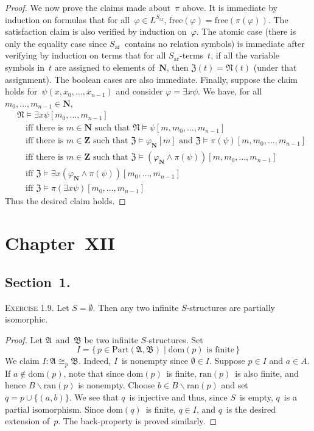 \documentclass[letterpaper]{article}
\newcommand{\N}{\mathbf{N}}
\newcommand{\Ns}{\mathfrak{N}}
\newcommand{\Z}{\mathbf{Z}}
\newcommand{\Zs}{\mathfrak{Z}}
\newcommand{\iso}{\cong}
\newcommand{\free}{\mathrm{free}}
\newcommand{\union}{\cup}
\newcommand{\A}{\mathfrak{A}}
\newcommand{\B}{\mathfrak{B}}
\newcommand{\piso}{\iso_p}
\newcommand{\pisos}{\mathrm{Part}}
\newcommand{\dom}{\mathrm{dom}}
\newcommand{\ran}{\mathrm{ran}}
\theoremstyle{remark}
\begin{document}
\begin{proof}
We now prove the claims made about~$\pi$ above. It is immediate by induction on formulas that for all~$\varphi\in L^{S_{\mathrm{ar}}}$, $\free(\varphi)=\free(\pi(\varphi))$. The satisfaction claim is also verified by induction on~$\varphi$. The atomic case (there is only the equality case since $S_{\mathrm{ar}}$~contains no relation symbols) is immediate after verifying by induction on terms that for all $S_{\mathrm{ar}}$-terms~$t$, if all the variable symbols in~$t$ are assigned to elements of~$\N$, then $\Zs(t)=\Ns(t)$ (under that assignment). The boolean cases are also immediate. Finally, suppose the claim holds for~$\psi(x,x_0,\ldots,x_{n-1})$ and consider $\varphi=\exists x\psi$. We have, for all $m_0,\ldots,m_{n-1}\in\N$,
\begin{align*}
&\Ns\models\exists x\psi[m_0,\ldots,m_{n-1}]\\
	&\quad\text{iff there is $m\in\N$ such that $\Ns\models\psi[m,m_0,\ldots,m_{n-1}]$}\\
	&\quad\text{iff there is $m\in\Z$ such that $\Zs\models\varphi_{\N}[m]$ and $\Zs\models\pi(\psi)[m,m_0,\ldots,m_{n-1}]$}\\
	&\quad\text{iff there is $m\in\Z$ such that $\Zs\models(\varphi_{\N}\land\pi(\psi))[m,m_0,\ldots,m_{n-1}]$}\\
	&\quad\text{iff $\Zs\models\exists x(\varphi_{\N}\land\pi(\psi))[m_0,\ldots,m_{n-1}]$}\\
	&\quad\text{iff $\Zs\models\pi(\exists x\psi)[m_0,\ldots,m_{n-1}]$}
\end{align*}
Thus the desired claim holds.
\end{proof}

\section*{Chapter~XII}

\subsection*{Section~1.}
\noindent\textsc{Exercise 1.9.}
Let $S=\emptyset$. Then any two infinite $S$-structures are partially isomorphic.
\begin{proof}
Let $\A$~and~$\B$ be two infinite $S$-structures. Set
$$I=\{\,p\in\pisos(\A,\B)\mid\text{$\dom(p)$~is finite}\,\}$$
We claim $I:\A\piso\B$. Indeed, $I$~is nonempty since $\emptyset\in I$. Suppose $p\in I$ and $a\in A$. If $a\not\in\dom(p)$, note that since $\dom(p)$~is finite, $\ran(p)$~is also finite, and hence $B\backslash\ran(p)$ is nonempty. Choose $b\in B\backslash\ran(p)$ and set $q=p\union\{(a,b)\}$. We see that $q$~is injective and thus, since $S$~is empty, $q$~is a partial isomorphism. Since $\dom(q)$~is finite, $q\in I$, and $q$~is the desired extension of~$p$. The back-property is proved similarly.
\end{proof}
\end{document}
